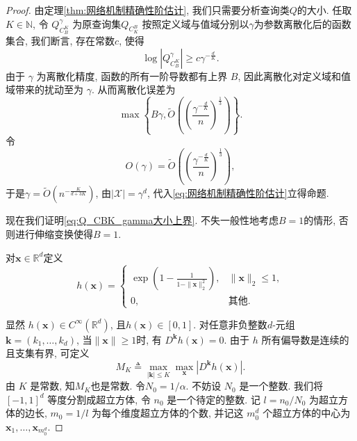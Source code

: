 \begin{proof}
  由定理\ref{thm:网络机制精确性阶估计}, 我们只需要分析查询类$Q$的大小. 任取 $K \in \mathbb{N}$, 令 $Q_{C_B^K}^{\gamma}$ 为原查询集$Q_{C_K^B}$ 按照定义域与值域分别以$\gamma$为参数离散化后的函数集合, 我们断言, 存在常数$c$, 使得
  \begin{equation}\label{eq:Q_CBK_gamma大小上界}
  \log \left|Q_{C_B^K}^{\gamma}\right| \ge c \gamma^{-\frac{d}{K}}.
  \end{equation}
  由于 $\gamma$ 为离散化精度, 函数的所有一阶导数都有上界 $B$, 因此离散化对定义域和值域带来的扰动至为 $\gamma$. 从而离散化误差为
  \[
  \max \left\{B\gamma, \tilde{O}\left(\left(\frac{\gamma^{-\frac{d}{K}}}{n}\right)^{\frac{1}{3}}\right)\right\}.
  \]
令
\[
  O(\gamma) = \tilde{O}\left(\left(\frac{\gamma^{-\frac{d}{K}}}{n}\right)^{\frac{1}{3}}\right),
\]
于是$\gamma = \tilde{O}\left(n^{-\frac{K}{d + 3K}}\right)$,
由$|\mathcal{X}| = \gamma^d$, 代入\eqref{eq:网络机制精确性阶估计}立得命题.

现在我们证明\eqref{eq:Q_CBK_gamma大小上界}. 不失一般性地考虑$B=1$的情形, 否则进行伸缩变换使得$B= 1$.

对$\mathbf{x} \in \mathbb{R}^d$定义
\[
h(\mathbf{x})= \begin{cases} \exp \left(1-\frac{1}{1-\|\mathbf{x}\|_2^2} \right),& \|\mathbf{x}\|_2 \leq 1, \\ 0,& \text{其他}. \end{cases}
\]

显然 $h(\mathbf{x})\in C^{\infty}(\mathbb{R}^d)$, 且$h(\mathbf{x}) \in [0,1]$. 对任意非负整数$d$-元组$\mathbf{k}=(k_1,\ldots,k_d)$, 当$\|\mathbf{x}\|\geq 1$时, 有 $D^{\mathbf{k}} h(\mathbf{x})=0$. 由于 $h$ 所有偏导数是连续的且支集有界, 可定义
\begin{equation*}
M_K \triangleq \max_{|\mathbf{k}|\leq K}\max_\mathbf{x} |D^{\mathbf{k}} h(\mathbf{x})|.
\end{equation*}
由 $K$ 是常数, 知$M_K$也是常数. 令$N_0=1/\alpha$. 不妨设 $N_0$ 是一个整数. 我们将 $[-1,1]^d$ 等度分割成超立方体, 令 $n_0$ 是一个待定的整数. 记 $l = n_0/N_0$ 为超立方体的边长, $m_0 = 1/l$ 为每个维度超立方体的个数, 并记这 $m_0^d$ 个超立方体的中心为 $\mathbf{x}_1,\ldots,\mathbf{x}_{m_0^d}$.


\end{proof}
